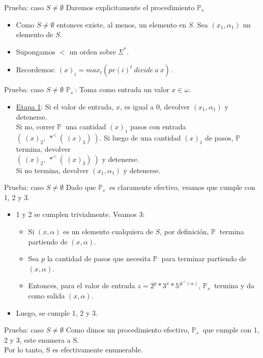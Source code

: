\documentclass[10pt]{beamer}
\newcommand{\p}{\mathbb{P}}
\begin{document}
\begin{frame}{Prueba: caso $S \neq \emptyset$}
  Daremos explicitamente el procedimiento $\p_{s}\ $
  \begin{itemize}[<+->]\justifying
    \item Como $S \neq \emptyset$ entonces existe, al menos, un elemento en $S$.
    Sea $(x_{1}, \alpha_{1})$ un elemento de $S$.
    \item Supongamos $<$ un orden sobre $\Sigma^{*}$.
    \item Recordemos: $(x)_{i} = max_{t}(pr(i)^{t}\ divide\ a\ x)$.
  \end{itemize}

\end{frame}



\begin{frame}{Prueba: caso $S \neq \emptyset$}
  \underline{$\p_{s}\ $}: Toma como entrada un valor $x \in \omega$.
  \begin{itemize}[<+->]\justifying
    \item[ ] \underline{Etapa 1}: Si el valor de entrada, $x$, es igual a $0$,
    devolver $(x_{1}, \alpha_{1})$ y detenerse. \\
    Si no, correr $\p\ $ una cantidad $(x)_{1}$ pasos con entrada
    $(\ (x)_{2},\ *^{<}(\ (x)_{3})\ )$. Si luego de una cantidad $(x)_{1}$
    de pasos, $\p\ $ termina, devolver \\ $(\ (x)_{2},\ *^{<}(\ (x)_{3})\ )$ y
    detenerse. \\
    Si no termina, devolver $(x_{1}, \alpha_{1})$ y detenerse.

  \end{itemize}
\end{frame}

\begin{frame}{Prueba: caso $S \neq \emptyset$}
  Dado que $\p_{s}\ $ es claramente efectivo, veamos que cumple con 1, 2 y 3.
  \begin{itemize}[<+->]\justifying
    \item 1 y 2 se cumplen trivialmente. Veamos 3:
    \begin{itemize}[<+->]\justifying
      \item Si $(x, \alpha)$ es un elemento cualquiera de $S$, por definición,
      $\p\ $ termina partiendo de $(x, \alpha)$.
      \item Sea $p$ la cantidad de pasos que necesita $\p\ $ para terminar partiendo
      de $(x, \alpha)$.
      \item Entonces, para el valor de entrada
      $z = 2^{p} * 3^{x} * 5^{\#^{<}(\alpha)}$, $\p_{s}\ $ termina y da como salida
      $(x, \alpha)$.
    \end{itemize}
    \item Luego, se cumple 1, 2 y 3.
  \end{itemize}

\end{frame}


\begin{frame}{Prueba: caso $S \neq \emptyset$}
  Como dimos un procedimiento efectivo, $\p_{s}\ $ que cumple con 1, 2 y 3, este
  enumera a S. \\
  Por lo tanto, S es efectivamente enumerable.
\end{frame}
\end{document}
